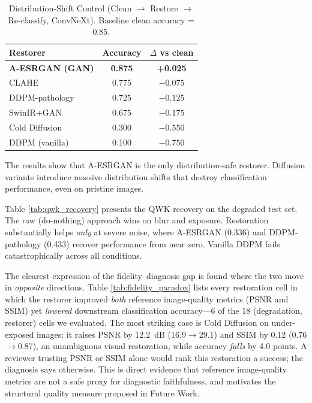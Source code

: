 \documentclass[conference]{IEEEtran}
\begin{document}
\begin{table}[htbp]
\caption{Distribution-Shift Control (Clean $\rightarrow$ Restore $\rightarrow$ Re-classify, ConvNeXt). Baseline clean accuracy = 0.85.}
\begin{center}
\begin{tabular}{lcc}
\toprule
\textbf{Restorer} & \textbf{Accuracy} & \textbf{$\Delta$ vs clean} \\
\midrule
\textbf{A-ESRGAN (GAN)} & \textbf{0.875} & \textbf{+0.025} \\
CLAHE & 0.775 & $-0.075$ \\
DDPM-pathology & 0.725 & $-0.125$ \\
SwinIR+GAN & 0.675 & $-0.175$ \\
Cold Diffusion & 0.300 & $-0.550$ \\
DDPM (vanilla) & 0.100 & $-0.750$ \\
\bottomrule
\end{tabular}
\label{tab:dist_shift}
\end{center}
\end{table}

The results show that A-ESRGAN is the only distribution-safe restorer. Diffusion variants introduce massive distribution shifts that destroy classification performance, even on pristine images.

Table \ref{tab:qwk_recovery} presents the QWK recovery on the degraded test set. The raw (do-nothing) approach wins on blur and exposure. Restoration substantially helps \textit{only} at severe noise, where A-ESRGAN (0.336) and DDPM-pathology (0.433) recover performance from near zero. Vanilla DDPM fails catastrophically across all conditions.

The clearest expression of the fidelity--diagnosis gap is found where the two move in \textit{opposite} directions. Table \ref{tab:fidelity_paradox} lists every restoration cell in which the restorer improved \textit{both} reference image-quality metrics (PSNR and SSIM) yet \textit{lowered} downstream classification accuracy---6 of the 18 (degradation, restorer) cells we evaluated. The most striking case is Cold Diffusion on under-exposed images: it raises PSNR by 12.2~dB (16.9$\rightarrow$29.1) and SSIM by 0.12 (0.76$\rightarrow$0.87), an unambiguous visual restoration, while accuracy \textit{falls} by 4.0 points. A reviewer trusting PSNR or SSIM alone would rank this restoration a success; the diagnosis says otherwise. This is direct evidence that reference image-quality metrics are not a safe proxy for diagnostic faithfulness, and motivates the structural quality measure proposed in Future Work.
\end{document}
